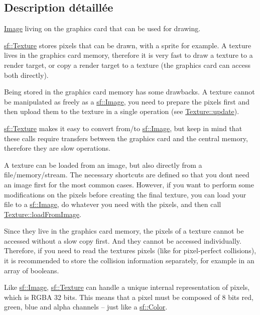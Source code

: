 \subsection{Description détaillée}
\hyperlink{classsf_1_1Image}{Image} living on the graphics card that can be used for drawing. 

\hyperlink{classsf_1_1Texture}{sf\+::\+Texture} stores pixels that can be drawn, with a sprite for example. A texture lives in the graphics card memory, therefore it is very fast to draw a texture to a render target, or copy a render target to a texture (the graphics card can access both directly).

Being stored in the graphics card memory has some drawbacks. A texture cannot be manipulated as freely as a \hyperlink{classsf_1_1Image}{sf\+::\+Image}, you need to prepare the pixels first and then upload them to the texture in a single operation (see \hyperlink{classsf_1_1Texture_ae4eab5c6781316840b0c50ad08370963}{Texture\+::update}).

\hyperlink{classsf_1_1Texture}{sf\+::\+Texture} makes it easy to convert from/to \hyperlink{classsf_1_1Image}{sf\+::\+Image}, but keep in mind that these calls require transfers between the graphics card and the central memory, therefore they are slow operations.

A texture can be loaded from an image, but also directly from a file/memory/stream. The necessary shortcuts are defined so that you don\textquotesingle{}t need an image first for the most common cases. However, if you want to perform some modifications on the pixels before creating the final texture, you can load your file to a \hyperlink{classsf_1_1Image}{sf\+::\+Image}, do whatever you need with the pixels, and then call \hyperlink{classsf_1_1Texture_abec4567ad9856a3596dc74803f26fba2}{Texture\+::load\+From\+Image}.

Since they live in the graphics card memory, the pixels of a texture cannot be accessed without a slow copy first. And they cannot be accessed individually. Therefore, if you need to read the texture\textquotesingle{}s pixels (like for pixel-\/perfect collisions), it is recommended to store the collision information separately, for example in an array of booleans.

Like \hyperlink{classsf_1_1Image}{sf\+::\+Image}, \hyperlink{classsf_1_1Texture}{sf\+::\+Texture} can handle a unique internal representation of pixels, which is R\+G\+BA 32 bits. This means that a pixel must be composed of 8 bits red, green, blue and alpha channels -- just like a \hyperlink{classsf_1_1Color}{sf\+::\+Color}.

